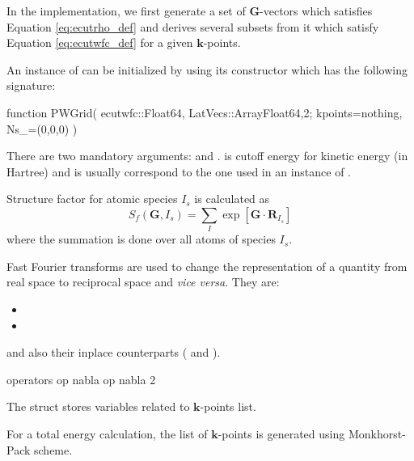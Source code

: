 In the implementation, we first generate a set of $\mathbf{G}$-vectors which satisfies
Equation \eqref{eq:ecutrho_def} and derives several subsets from it which
satisfy Equation \eqref{eq:ecutwfc_def} for a given $\mathbf{k}$-points.

An instance of  can be initialized by using its constructor
which has the following signature:
\begin{juliacode}
function PWGrid( ecutwfc::Float64, LatVecs::Array{Float64,2};
    kpoints=nothing, Ns_=(0,0,0) )
\end{juliacode}
There are two mandatory arguments:  and .
 is cutoff energy for kinetic energy (in Hartree) and
 is usually correspond to the one used in an
instance of .

Structure factor for atomic species $I_{s}$ is calculated as
\begin{equation}
S_{f}(\mathbf{G},I_{s}) = \sum_{I} \exp\left[\mathbf{G} \cdot \mathbf{R}_{I_s}\right]
\end{equation}
where the summation is done over all atoms of species $I_s$.

Fast Fourier transforms are used to change the representation of a quantity from
real space to reciprocal space and \textit{vice versa}. They are:
\begin{itemize}
\item {}
\item {}
\end{itemize}
and also their inplace counterparts ( and ).

operators op nabla op nabla 2


The  struct stores variables related to $\mathbf{k}$-points
list.

For a total energy calculation, the list of $\mathbf{k}$-points is
generated using Monkhorst-Pack scheme.
